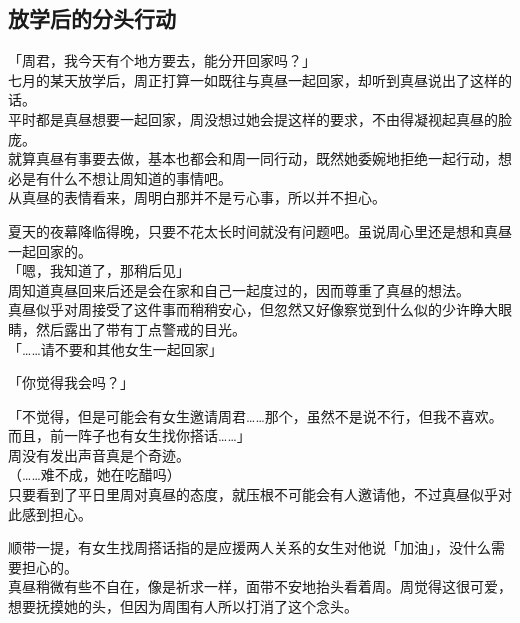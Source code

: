 \subsection{放学后的分头行动}

「周君，我今天有个地方要去，能分开回家吗？」\\

七月的某天放学后，周正打算一如既往与真昼一起回家，却听到真昼说出了这样的话。\\

平时都是真昼想要一起回家，周没想过她会提这样的要求，不由得凝视起真昼的脸庞。\\

就算真昼有事要去做，基本也都会和周一同行动，既然她委婉地拒绝一起行动，想必是有什么不想让周知道的事情吧。\\

从真昼的表情看来，周明白那并不是亏心事，所以并不担心。

夏天的夜幕降临得晚，只要不花太长时间就没有问题吧。虽说周心里还是想和真昼一起回家的。\\

「嗯，我知道了，那稍后见」\\

周知道真昼回来后还是会在家和自己一起度过的，因而尊重了真昼的想法。\\

真昼似乎对周接受了这件事而稍稍安心，但忽然又好像察觉到什么似的少许睁大眼睛，然后露出了带有丁点警戒的目光。\\

「……请不要和其他女生一起回家」

「你觉得我会吗？」

「不觉得，但是可能会有女生邀请周君……那个，虽然不是说不行，但我不喜欢。而且，前一阵子也有女生找你搭话……」\\

周没有发出声音真是个奇迹。\\

（……难不成，她在吃醋吗）\\

只要看到了平日里周对真昼的态度，就压根不可能会有人邀请他，不过真昼似乎对此感到担心。

顺带一提，有女生找周搭话指的是应援两人关系的女生对他说「加油」，没什么需要担心的。\\

真昼稍微有些不自在，像是祈求一样，面带不安地抬头看着周。周觉得这很可爱，想要抚摸她的头，但因为周围有人所以打消了这个念头。\\


